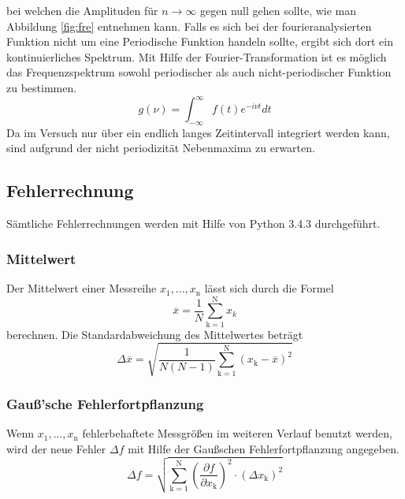 bei welchen die Amplituden für $n \rightarrow \infty$ gegen null gehen sollte, wie man Abbildung \ref{fig:fre} entnehmen kann. Falls es sich bei der fourieranalysierten Funktion nicht um eine Periodische Funktion handeln sollte, ergibt sich dort ein kontinuierliches Spektrum.
Mit Hilfe der Fourier-Transformation ist es möglich das Frequenzspektrum sowohl periodischer als auch nicht-periodischer Funktion zu bestimmen.
\begin{equation}
  g(\nu) = \int^{\infty}_{- \infty} f(t) e^{-i \nu t} dt
  \label{eqn:four-trafo}
\end{equation}
Da im Versuch nur über ein endlich langes Zeitintervall integriert werden kann, sind aufgrund der nicht periodizität Nebenmaxima zu erwarten.
\subsection{Fehlerrechnung}
Sämtliche Fehlerrechnungen werden mit Hilfe von Python 3.4.3 durchgeführt.
\subsubsection{Mittelwert}
Der Mittelwert einer Messreihe $x_\text{1}, ... ,x_\text{n}$ lässt sich durch die Formel
\begin{equation}
	\overline{x} = \frac{1}{N} \sum_{\text{k}=1}^\text{N} x_k
	\label{eqn:ave}
\end{equation}
berechnen. Die Standardabweichung des Mittelwertes beträgt
\begin{equation}
	\Delta \overline{x} = \sqrt{ \frac{1}{N(N-1)} \sum_{\text{k}=1}^\text{N} (x_\text{k} - \overline{x})^2}
	\label{eqn:std}
\end{equation}

\subsubsection{Gauß'sche Fehlerfortpflanzung}
Wenn $x_\text{1}, ..., x_\text{n}$ fehlerbehaftete Messgrößen im weiteren Verlauf benutzt werden, wird der neue Fehler $\Delta f$ mit Hilfe der Gaußschen Fehlerfortpflanzung angegeben.
\begin{equation}
	\Delta f = \sqrt{\sum_{\text{k}=1}^\text{N} \left( \frac{ \partial f}{\partial x_\text{k}} \right) ^2 \cdot (\Delta x_\text{k})^2}
	\label{eqn:var}
\end{equation}

